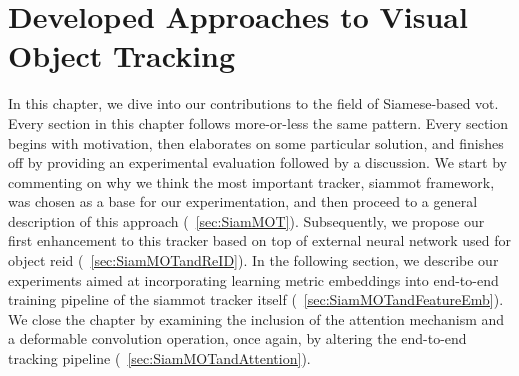 \chapter{Developed Approaches to Visual Object Tracking}
\label{chap:DevelopedVisualTrackingApproaches}

In this chapter, we dive into our contributions to the field of Siamese-based \gls{vot}. Every section in this chapter follows more-or-less the same pattern. Every section begins with motivation, then elaborates on some particular solution, and finishes off by providing an experimental evaluation followed by a discussion. We start by commenting on why we think the most important tracker, \gls{siammot} framework, was chosen as a base for our experimentation, and then proceed to a general description of this approach (\sectiontext{}~\ref{sec:SiamMOT}). Subsequently, we propose our first enhancement to this tracker based on top of external neural network used for object \gls{reid} (\sectiontext{}~\ref{sec:SiamMOTandReID}). In the following section, we describe our experiments aimed at incorporating learning metric embeddings into end-to-end training pipeline of the \gls{siammot} tracker itself (\sectiontext{}~\ref{sec:SiamMOTandFeatureEmb}). We close the chapter by examining the inclusion of the attention mechanism and a deformable convolution operation, once again, by altering the end-to-end tracking pipeline (\sectiontext{}~\ref{sec:SiamMOTandAttention}).






